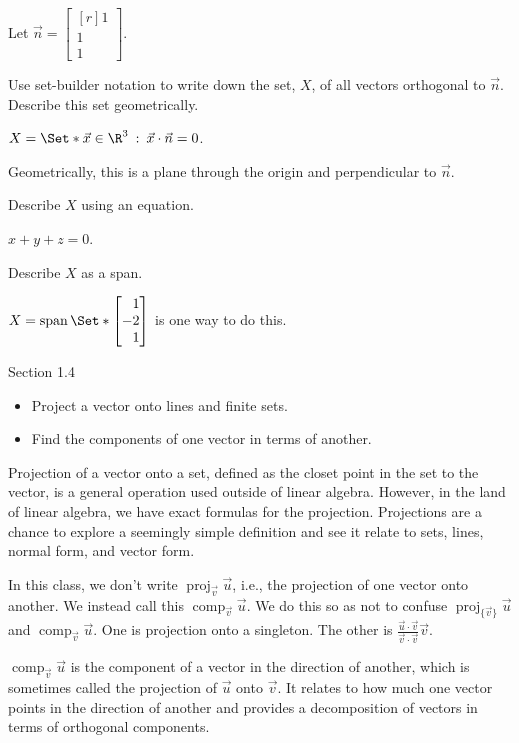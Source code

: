 \documentclass{problemset}
\DeclareMathOperator{\Span}{span}
\DeclareMathOperator{\Comp}{comp}
\DeclareMathOperator{\Proj}{proj}
\newcommand{\mat}[1]{\begin{bmatrix*}[r]#1\end{bmatrix*}}
\providecommand\given{}
\newcommand\SetSymbol[1][]{%
	\nonscript\::%
	\allowbreak
	\nonscript\:
	\mathopen{}}
\renewcommand\given{\SetSymbol[\delimsize]}
\begin{document}
	\question
	Let $\vec n=\mat{1\\1\\1}$.
	\begin{parts}
		\item Use set-builder notation to write down the set, $X$, of
			all vectors orthogonal to $\vec n$. Describe this set
			geometrically.
			\begin{solution}
				$X = \Set*{\vec x\in \R^3 \given \vec x\cdot \vec n = 0}$.

				Geometrically, this is a plane through the origin and 
				perpendicular to $\vec n$. 
			\end{solution}
		\item Describe $X$ using an equation.
			\begin{solution}[inline]
				$x+y+z=0$.
			\end{solution}
		\item Describe $X$ as a span.
			\begin{solution}[inline]
				$X = \Span\Set*{\mat{1\\-2\\1}}$ is one way to do this.
			\end{solution}
	\end{parts}


\begin{lesson}
	\newpage

	Section 1.4

	\begin{itemize}
		\item Project a vector onto lines and finite sets.
		\item Find the components of one vector in terms of another.
	\end{itemize}

	Projection of a vector onto a set, defined as the closet point in the
	set to the vector, is a general operation used outside of linear algebra.
	However, in the land of linear algebra, we have exact formulas for the
	projection. Projections are a chance to explore a seemingly simple definition
	and see it relate to sets, lines, normal form, and vector form.

	\begin{annotation}
		\begin{notes}
			In this class, we don't write $\Proj_{\vec v}\vec u$,
			i.e., the projection of one vector onto another. We
			instead call this $\Comp_{\vec v}\vec u$. We do this so
			as not to confuse $\Proj_{\{\vec v\}}\vec u$ and
			$\Comp_{\vec v}\vec u$. One is projection onto a singleton.
			The other is $\frac{\vec u\cdot \vec v}{\vec v\cdot \vec v}\vec v$.
		\end{notes}
	\end{annotation}
	$\Comp_{\vec v}\vec u$ is the component of a vector in the direction of another, 
	which is sometimes called the projection of $\vec u$ onto $\vec v$. It relates
	to how much one vector points in the direction of another and
	provides a decomposition of vectors in terms of orthogonal components. 
	

	\newpage
\end{lesson}
\end{document}
